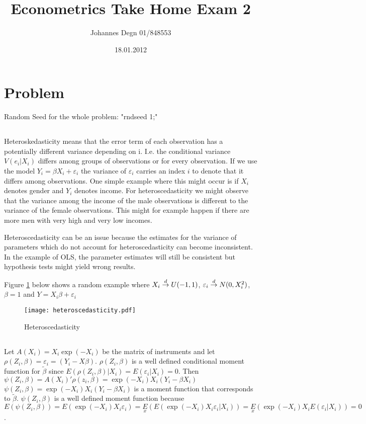 \documentclass[11pt]{article}
\title{\textbf{Econometrics Take Home Exam 2}}
\author{Johannes Degn 01/848553}
\date{18.01.2012}
\theoremstyle{break}
\begin{document}
\maketitle


\section{Problem}
Random Seed for the whole problem: "rndseed 1;"

\subsection{}
Heteroskedasticity means that the error term of each observation has a potentially different variance depending on i. I.e. the conditional variance $V(e_i|X_i)$ differs among groups of observations or for every observation. If we use the model $Y_i = \beta X_i + \varepsilon_i$ the variance of $\varepsilon_i$ carries an index $i$ to denote that it differs among observations. One simple example where this might occur is if $X_i$ denotes gender and $Y_i$ denotes income. For heteroscedasticity we might observe that the variance among the income of the male observations is different to the variance of the female observations. This might for example happen if there are more men with very high and very low incomes.

Heteroscedasticity can be an issue because the estimates for the variance of parameters which do not account for heteroscedasticity can become inconsistent. In the example of OLS, the parameter estimates will still be consistent but hypothesis tests might yield wrong results.

Figure \ref{heteroscedasticity} below shows a random example where $X_i \;{\buildrel d \over \rightarrow}\; U(-1, 1)$, $\varepsilon_i \;{\buildrel d \over \rightarrow}\; N(0, X_i^2)$, $\beta = 1$ and $Y = X_i\beta+\varepsilon_i$

\begin{figure}[H]
\centering
\texttt{[image: heteroscedasticity.pdf]}
\caption{Heteroscedasticity}
\label{heteroscedasticity}
\end{figure}


\subsection{}
Let $A(X_i) = X_i\exp(-X_i)$ be the matrix of instruments and let $\rho(Z_i, \beta) = \varepsilon_i = (Y_i - X\beta)$. $\rho(Z_i, \beta)$ is a well defined conditional moment function for $\tilde{\beta}$ since $E(\rho(Z_i, \beta)| X_i) = E(\varepsilon_i | X_i) = 0$. Then $\psi(Z_i, \beta) = A(X_i)'\rho(z_i, \beta) = \exp(-X_i)X_i(Y_i-\beta X_i)$
\\
$\psi(Z_i, \beta) = \exp(-X_i)X_i(Y_i - \beta X_i)$ is a moment function that corresponds to $\tilde{\beta}$. $\psi(Z_i, \beta)$ is a well defined moment function because $E(\psi(Z_i, \beta)) = E(\exp(-X_i)X_i\varepsilon_i) = \underset{x}{E}(E(\exp(-X_i)X_i\varepsilon_i|X_i)) = \underset{x}{E}(\exp(-X_i)X_iE(\varepsilon_i|X_i)) = 0$. \\
\end{document}
